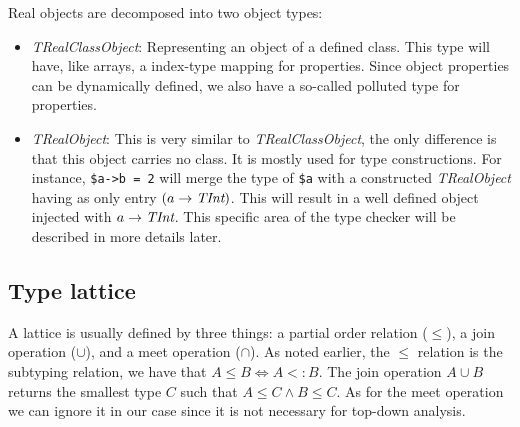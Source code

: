 \documentclass[a4paper]{article}
\begin{document}
\begin{itemize}
    Real objects are decomposed into two object types:
    \begin{itemize}
          \item \emph{TRealClassObject}: Representing an object of a
            defined class. This type will have, like arrays, a index-type
            mapping for properties. Since object properties can be dynamically
            defined, we also have a so-called polluted type for properties.
          \item \emph{TRealObject}: This is very similar to
            \emph{TRealClassObject}, the only difference is that this object
            carries no class. It is mostly used for type constructions. For
            instance, \verb/$a->b = 2/ will merge the type of \verb/$a/ with a
            constructed \emph{TRealObject} having as only entry $(a \rightarrow
            \emph{TInt})$. This will result in a well defined object injected
            with $a \rightarrow \emph{TInt}$. This specific area of the type
            checker will be described in more details later.
    \end{itemize}
\end{itemize}

\subsection{Type lattice}
A lattice is usually defined by three things: a partial order relation
($\leq$), a join operation ($\cup$), and a meet operation ($\cap$). As noted
earlier, the $\leq$ relation is the subtyping relation, we have that $A \leq B
\Leftrightarrow A <: B$. The join operation $A \cup B$ returns the smallest
type $C$ such that $A \leq C \wedge B \leq C$. As for the meet operation
we can ignore it in our case since it is not necessary for top-down analysis.
\end{document}
